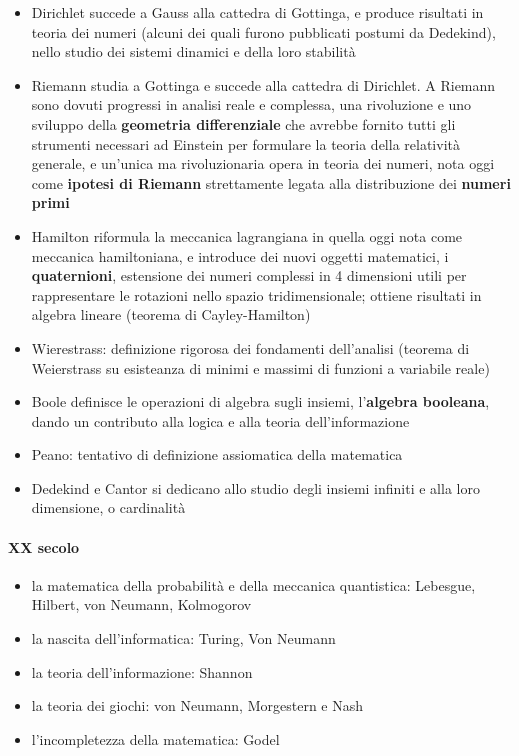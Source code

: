 \begin{itemize}
  \item Dirichlet succede a Gauss alla cattedra di Gottinga, e produce risultati in teoria dei numeri (alcuni dei quali furono pubblicati postumi da Dedekind), nello studio dei sistemi dinamici e della loro stabilità
  \item Riemann studia a Gottinga e succede alla cattedra di Dirichlet. A Riemann sono dovuti progressi in analisi reale e complessa, una rivoluzione e uno sviluppo della \textbf{geometria differenziale} che avrebbe fornito tutti gli strumenti necessari ad Einstein per formulare la teoria della relatività generale, e un'unica ma rivoluzionaria opera in teoria dei numeri, nota oggi come \textbf{ipotesi di Riemann} strettamente legata alla distribuzione dei \textbf{numeri primi}
  \item Hamilton riformula la meccanica lagrangiana in quella oggi nota come meccanica hamiltoniana, e introduce dei nuovi oggetti matematici, i \textbf{quaternioni}, estensione dei numeri complessi in 4 dimensioni utili per rappresentare le rotazioni nello spazio tridimensionale; ottiene risultati in algebra lineare (teorema di Cayley-Hamilton)
  \item Wierestrass: definizione rigorosa dei fondamenti dell'analisi (teorema di Weierstrass su esisteanza di minimi e massimi di funzioni a variabile reale)
  \item Boole definisce le operazioni di algebra sugli insiemi, l'\textbf{algebra booleana}, dando un contributo alla logica e alla teoria dell'informazione
  \item Peano: tentativo di definizione assiomatica della matematica
  \item Dedekind e Cantor si dedicano allo studio degli insiemi infiniti e alla loro dimensione, o cardinalità
\end{itemize}
\paragraph{XX secolo}
\begin{itemize}
  \item la matematica della probabilità e della meccanica quantistica: Lebesgue, Hilbert, von Neumann, Kolmogorov
  \item la nascita dell'informatica: Turing, Von Neumann
  \item la teoria dell'informazione: Shannon
  \item la teoria dei giochi: von Neumann, Morgestern e Nash
  \item l'incompletezza della matematica: Godel
\end{itemize}

